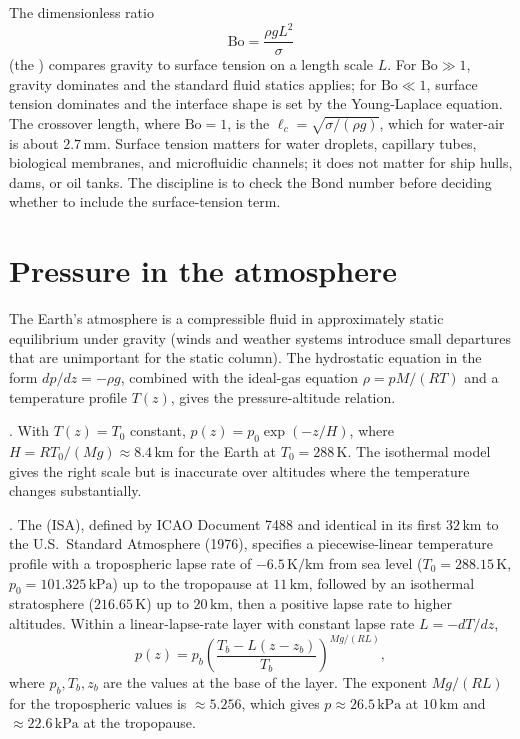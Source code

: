  The dimensionless
ratio
\[
\text{Bo} = \frac{\rho g L^2}{\sigma}
\]
(the ) compares gravity to surface tension
on a length scale $L$. For $\text{Bo} \gg 1$, gravity dominates
and the standard fluid statics applies; for $\text{Bo} \ll 1$,
surface tension dominates and the interface shape is set by the
Young-Laplace equation. The crossover length, where $\text{Bo} =
1$, is the  $\ell_c = \sqrt{\sigma/(
\rho g)}$, which for water-air is about $2.7\,\si{\milli\meter}$.
Surface tension matters for water droplets, capillary tubes,
biological membranes, and microfluidic channels; it does not
matter for ship hulls, dams, or oil tanks. The discipline is to
check the Bond number before deciding whether to include the
surface-tension term.

\section{Pressure in the atmosphere}

The Earth's atmosphere is a compressible fluid in approximately
static equilibrium under gravity (winds and weather systems
introduce small departures that are unimportant for the static
column). The hydrostatic equation in the form $dp/dz = -\rho g$,
combined with the ideal-gas equation $\rho = pM/(RT)$ and a
temperature profile $T(z)$, gives the pressure-altitude relation.

. With $T(z) = T_0$ constant,
$p(z) = p_0 \exp(-z/H)$, where $H = RT_0/(Mg) \approx 8.4\,
\si{\kilo\meter}$ for the Earth at $T_0 = 288\,\text{K}$. The
isothermal model gives the right scale but is inaccurate over
altitudes where the temperature changes substantially.

. The  (ISA), defined by ICAO Document 7488 and
identical in its first $32\,\si{\kilo\meter}$ to the U.S.\
Standard Atmosphere (1976), specifies a piecewise-linear
temperature profile with a tropospheric lapse rate of $-6.5\,
\si{\kelvin\per\kilo\meter}$ from sea level ($T_0 = 288.15\,
\text{K}$, $p_0 = 101.325\,\text{kPa}$) up to the tropopause at
$11\,\si{\kilo\meter}$, followed by an isothermal stratosphere
($216.65\,\text{K}$) up to $20\,\si{\kilo\meter}$, then a positive
lapse rate to higher altitudes. Within a linear-lapse-rate
layer with constant lapse rate $L = -dT/dz$,
\[
p(z) = p_b \left(\frac{T_b - L(z - z_b)}{T_b}\right)^{Mg/(RL)},
\]
where $p_b, T_b, z_b$ are the values at the base of the layer.
The exponent $Mg/(RL)$ for the tropospheric values is $\approx
5.256$, which gives $p \approx 26.5\,\text{kPa}$ at $10\,\si{
\kilo\meter}$ and $\approx 22.6\,\text{kPa}$ at the tropopause.

